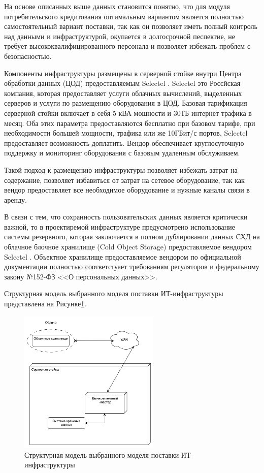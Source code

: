 \documentclass[14pt, a4paper]{extarticle}
\begin{document}
На основе описанных выше данных становится понятно, что для модуля потребительского кредитования
оптимальным вариантом является полностью самостоятельный вариант поставки, так как он позволяет
иметь полный контроль над данными и инфраструктурой, окупается в долгосрочной песпектие, не
требует высококвалифицированного персонала и позволяет избежать проблем с безопасностью.

Компоненты инфраструктуры размещены в серверной стойке внутри
Центра обработки данных (ЦОД) предоставляемым Selectel \cite{selectel-web}.
Selectel это Россйская компания, которая предоставляет услуги облачных вычислений,
выделенных серверов и услуги по размещению оборудования в ЦОД. Базовая тарификация
серверной стойки включает в себя 5 кВА мощности и 30ТБ интернет трафика в месяц.
Оба этих параметра предоставляются бесплатно при базовом тарифе, при необходимости
большей мощности, трафика или же 10ГБит/с портов, Selectel предоставляет возможность
доплатить. Вендор обеспечивает круглосуточную поддержку и мониторинг оборудования с
базовым удаленным обслуживаем.

Такой подход к размещению инфраструктуры позволяет избежать затрат на содержание,
позволяет избавиться от затрат на сетевое оборудование, так как вендор предоставляет
все необходимое оборудование и нужные каналы связи в аренду.

В связи с тем, что сохранность пользовательских данных является критически важной,
то в проектиремой инфраструктуре предусмотрено использование системы резервного,
которая заключается в полном дублировании данных СХД на облачное блочное хранилище
(Cold Object Storage) предоставляемое вендором Selectel \cite{selectel-block-storage}.
Объектное хранилище предоставляемое вендором по официальной документации полностью
соответстуает требованиям регуляторов и федеральному закону №152-ФЗ <<О персональных
данных>>.

Структурная модель выбранного моделя поставки ИТ-инфраструктуры представлена на
Рисунке\;\ref{fig:infra1}.

\begin{figure}[H]
  \centering
  \includegraphics[width=0.6\textwidth]{infra1_3.png}
  \caption{Структурная модель выбранного моделя поставки ИТ-инфраструктуры}
  \label{fig:infra1}
\end{figure}
\end{document}
